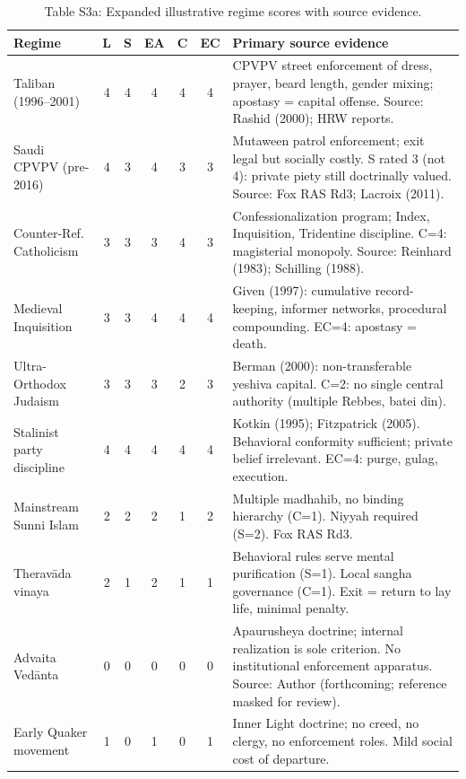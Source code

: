 \documentclass[12pt]{article}
\begin{document}
\begin{table}[ht]
\centering
\caption{Table S3a: Expanded illustrative regime scores with source evidence.}
\small
\begin{tabular}{lcccccp{4.5cm}}
\toprule
Regime & L & S & EA & C & EC & Primary source evidence \\
\midrule
Taliban (1996--2001) & 4 & 4 & 4 & 4 & 4 & CPVPV street enforcement of dress, prayer, beard length, gender mixing; apostasy = capital offense. Source: Rashid (2000); HRW reports. \\
Saudi CPVPV (pre-2016) & 4 & 3 & 4 & 3 & 3 & Mutaween patrol enforcement; exit legal but socially costly. S rated 3 (not 4): private piety still doctrinally valued. Source: Fox RAS Rd3; Lacroix (2011). \\
Counter-Ref. Catholicism & 3 & 3 & 3 & 4 & 3 & Confessionalization program; Index, Inquisition, Tridentine discipline. C=4: magisterial monopoly. Source: Reinhard (1983); Schilling (1988). \\
Medieval Inquisition & 3 & 3 & 4 & 4 & 4 & Given (1997): cumulative record-keeping, informer networks, procedural compounding. EC=4: apostasy = death. \\
Ultra-Orthodox Judaism & 3 & 3 & 3 & 2 & 3 & Berman (2000): non-transferable yeshiva capital. C=2: no single central authority (multiple Rebbes, batei din). \\
Stalinist party discipline & 4 & 4 & 4 & 4 & 4 & Kotkin (1995); Fitzpatrick (2005). Behavioral conformity sufficient; private belief irrelevant. EC=4: purge, gulag, execution. \\
Mainstream Sunni Islam & 2 & 2 & 2 & 1 & 2 & Multiple madhahib, no binding hierarchy (C=1). Niyyah required (S=2). Fox RAS Rd3. \\
Therav\=ada vinaya & 2 & 1 & 2 & 1 & 1 & Behavioral rules serve mental purification (S=1). Local sangha governance (C=1). Exit = return to lay life, minimal penalty. \\
Advaita Ved\=anta & 0 & 0 & 0 & 0 & 0 & Apaurusheya doctrine; internal realization is sole criterion. No institutional enforcement apparatus. Source: Author (forthcoming; reference masked for review). \\
Early Quaker movement & 1 & 0 & 1 & 0 & 1 & Inner Light doctrine; no creed, no clergy, no enforcement roles. Mild social cost of departure. \\
\bottomrule
\end{tabular}
\end{table}
\end{document}
